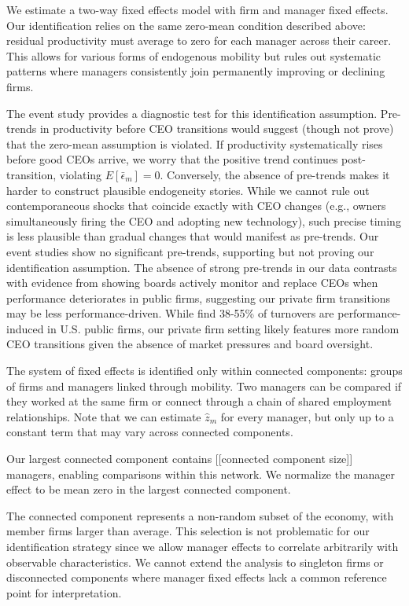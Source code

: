 \documentclass[11pt,a4paper]{article}
\begin{document}
We estimate a two-way fixed effects model with firm and manager fixed effects. Our identification relies on the same zero-mean condition described above: residual productivity must average to zero for each manager across their career. This allows for various forms of endogenous mobility but rules out systematic patterns where managers consistently join permanently improving or declining firms. 

The event study provides a diagnostic test for this identification assumption. Pre-trends in productivity before CEO transitions would suggest (though not prove) that the zero-mean assumption is violated. If productivity systematically rises before good CEOs arrive, we worry that the positive trend continues post-transition, violating $E[\bar{\epsilon}_m] = 0$. Conversely, the absence of pre-trends makes it harder to construct plausible endogeneity stories. While we cannot rule out contemporaneous shocks that coincide exactly with CEO changes (e.g., owners simultaneously firing the CEO and adopting new technology), such precise timing is less plausible than gradual changes that would manifest as pre-trends. Our event studies show no significant pre-trends, supporting but not proving our identification assumption. The absence of strong pre-trends in our data contrasts with evidence from \citet{cornelli2013monitoring} showing boards actively monitor and replace CEOs when performance deteriorates in public firms, suggesting our private firm transitions may be less performance-driven. While \citet{jenter2021performance} find 38-55\% of turnovers are performance-induced in U.S. public firms, our private firm setting likely features more random CEO transitions given the absence of market pressures and board oversight.

The system of fixed effects is identified only within connected components: groups of firms and managers linked through mobility. Two managers can be compared if they worked at the same firm or connect through a chain of shared employment relationships. Note that we can estimate $\hat z_m$ for every manager, but only up to a constant term that may vary across connected components. 


Our largest connected component contains [[connected component size]] managers, enabling comparisons within this network. We normalize the manager effect to be mean zero in the largest connected component.

The connected component represents a non-random subset of the economy, with member firms larger than average. This selection is not problematic for our identification strategy since we allow manager effects to correlate arbitrarily with observable characteristics. We cannot extend the analysis to singleton firms or disconnected components where manager fixed effects lack a common reference point for interpretation.
\end{document}
